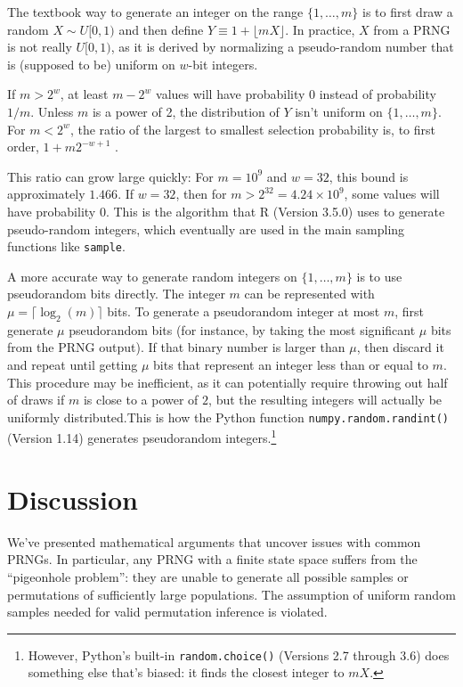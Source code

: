 \documentclass[graybox]{svmult}
\begin{document}
The textbook way to generate an integer on the range $\{1, \ldots, m\}$ is to first draw a random $X \sim U[0,1)$
and then define $Y \equiv 1 + \lfloor mX \rfloor$. 
In practice, $X$ from a PRNG is not really $U[0,1)$, as it is derived by normalizing a pseudo-random number that is
 (supposed to be) uniform on $w$-bit integers. 

If $m > 2^w$, at least $m-2^w$ values will have probability 0 instead of probability $1/m$.
Unless $m$ is a power of 2, the distribution of $Y$ isn't uniform on $\{1, \ldots, m\}$. 
For $m < 2^w$, the ratio of the largest to smallest selection probability is, to first order,  $1+ m 2^{-w+1}$ \cite{knuth_art_1997}.

This ratio can grow large quickly: For $m = 10^9$ and $w=32$, this bound is approximately $1.466$. 
If $w=32$, then for $m>2^{32}=4.24 \times 10^9$, some values will have probability 0. 
This is the algorithm that R (Version 3.5.0) \cite{R_2018} uses to generate pseudo-random integers,
which eventually are used in the main sampling functions like \texttt{sample}.
    
A more accurate way to generate random integers on $\{1, \dots, m\}$ is to use pseudorandom bits directly. 
The integer $m$ can be represented with $\mu = \lceil \log_2(m) \rceil$ bits. 
To generate a pseudorandom integer at most $m$, first generate $\mu$ pseudorandom bits (for instance, by taking the most significant $\mu$ bits from the PRNG output).  
If that binary number is larger than $\mu$, then discard it and repeat until getting $\mu$ bits that represent an integer less than or equal to $m$.
This procedure may be inefficient, as it can potentially require throwing out half of draws if $m$ is close to a power of $2$, but the resulting integers will actually be uniformly distributed.This is how the Python function \texttt{numpy.random.randint()} (Version 1.14) generates pseudorandom integers.\footnote{
However, Python's built-in \texttt{random.choice()} (Versions 2.7 through 3.6) does something else that's biased: it finds the closest integer to $mX$.
}


\section{Discussion}
\label{sec:discussion}

We've presented mathematical arguments that uncover issues with common PRNGs.
In particular, any PRNG with a finite state space suffers from the ``pigeonhole problem'':
they are unable to generate all possible samples or permutations of sufficiently large populations.
The assumption of uniform random samples needed for valid permutation inference is violated.
\end{document}

